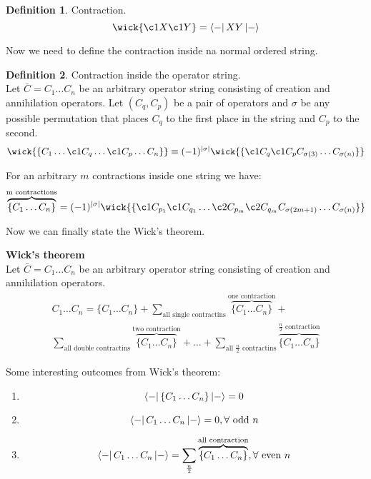 \documentclass[twoside,english]{uiofysmaster}
\theoremstyle{definition}
\newtheorem{defn}{Definition}
\begin{document}
\begin{defn} Contraction.
		\begin{equation}
	\wick{\c1 X \c1 Y}=\bra{-} XY \ket{-}
	\end{equation}
\end{defn}
Now we need to define the contraction inside na normal ordered string.
\begin{defn} Contraction inside the operator string.\\
	Let $ \bar{C}=C_1 \dots C_n $ be an arbitrary operator string consisting of creation and annihilation operators. Let $(C_q, C_p)$ be a pair of operators and $\sigma$ be any possible permutation that places $C_q$ to the first place in the string and
	 $C_p$ to the second.
\begin{equation}
	\wick{\{ C_1 \dots \c1 C_q  \dots \c1 C_p \dots C_n \} } \equiv (-1)^{\mid \sigma \mid} \wick{ \{  \c1 C_q  \c1 C_p C_{\sigma(3)} \dots C_{\sigma(n)} \} }
\end{equation}
	
	For an arbitrary $m$ contractions inside one string we have:
\begin{equation}
	\overbrace{ \{ C_1 \dots C_n\} }^\text{m contractions}=(-1)^{\mid \sigma \mid} 
	\wick{\{ \c1 C_{p_1} \c1 C_{q_1} \dots \c2 C_{p_m} \c2 C_{q_m} C_{\sigma(2m+1)}\dots C_{\sigma(n)}  \} }
\end{equation}
\end{defn}
Now we can finally state the Wick's theorem.
\begin{theorem} \textbf{ Wick's theorem} \\
Let $ \bar{C}=C_1 \dots C_n $ be an arbitrary operator string consisting of creation and annihilation operators.
\begin{gather}
C_1 \dots C_n=\{C_1 \dots C_n\} + \sum_{\text{all single contractins}} \overbrace{ \{ C_1 \dots C_n\} }^\text{one contraction} +\\ \sum_{\text{all double contractins}} \overbrace{ \{ C_1 \dots C_n\} }^\text{two contraction}+ \dots + 
 \sum_{\text{all $\frac{n}{2}$ contractins}} \overbrace{ \{ C_1 \dots C_n\} }^\text{$\frac{n}{2}$ contraction}
\end{gather}
\end{theorem}
Some interesting outcomes from Wick's theorem:
 
\begin{enumerate}
	\item \[\bra{-} \{C_1 \dots C_n\} \ket{-}=0\]
	\item \[\bra{-} C_1 \dots C_n \ket{-}=0,  \forall  \text{ odd } n\] 
	\item \[\bra{-} C_1 \dots C_n \ket{-}= \sum_{\frac{n}{2}} \overbrace{ \{C_1 \dots C_n\}}^{\text{all contraction}}, \forall \text{ even } n \]
\end{enumerate}
\end{document}

